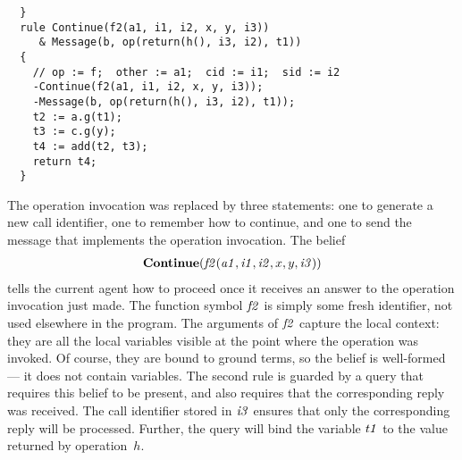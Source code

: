 \documentclass[a4paper,12pt,oneside,fleqn]{book} %
\begin{document}
\begin{example}
\begin{verbatim}
  }
  rule Continue(f2(a1, i1, i2, x, y, i3))
     & Message(b, op(return(h(), i3, i2), t1))
  {
    // op := f;  other := a1;  cid := i1;  sid := i2
    -Continue(f2(a1, i1, i2, x, y, i3));
    -Message(b, op(return(h(), i3, i2), t1));
    t2 := a.g(t1);
    t3 := c.g(y);
    t4 := add(t2, t3);
    return t4;
  }
\end{verbatim}
The operation invocation was replaced by three statements: one to generate
a new call identifier, one to remember how to continue, and one to send the
message that implements the operation invocation. The belief
\begin{align}
  {\bf Continue}
    ({\it f2}({\it a1}, {\it i1}, {\it i2}, x, y, {\it i3}))
\end{align}
tells the current agent how to proceed once it receives an answer to the
operation invocation just made. The function symbol $\it f2$ is simply some
fresh identifier, not used elsewhere in the program. The arguments of $\it
f2$ capture the local context: they are all the local variables visible at
the point where the operation was invoked. Of course, they are bound to
ground terms, so the belief is well-formed --- it does not contain
variables. The second rule is guarded by a query that requires this belief
to be present, and also requires that the corresponding reply was received.
The call identifier stored in $\it i3$ ensures that only the corresponding
reply will be processed. Further, the query will bind the variable $\it t1$
to the value returned by operation~$h$.


\end{example}
\end{document}

